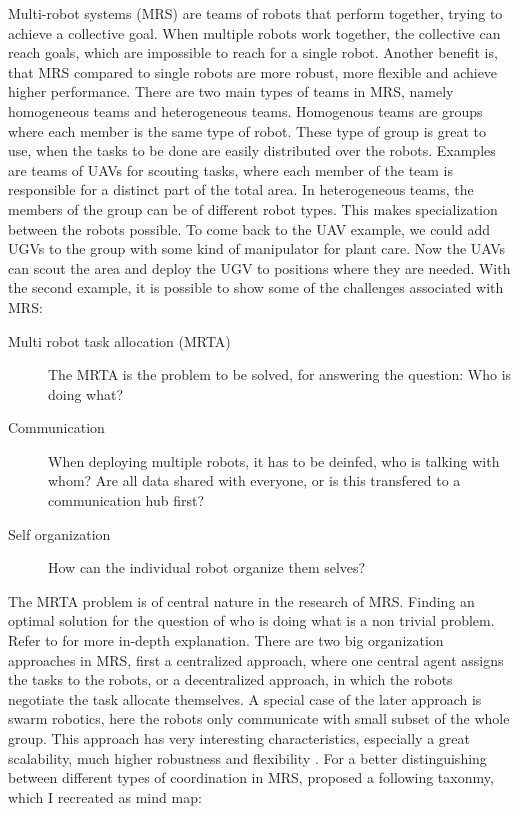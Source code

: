         Multi-robot systems (MRS) are teams of robots that perform together, trying to achieve a collective goal. When multiple robots work together, the collective can reach goals, which are impossible to reach for a single robot. Another benefit is, that MRS compared to single robots are more robust, more flexible and achieve higher performance. \cite{Albani2017}
        There are two main types of teams in MRS, namely homogeneous teams and heterogeneous teams. Homogenous teams are groups where each member is the same type of robot. These type of group is great to use, when the tasks to be done are easily distributed over the robots. Examples are teams of UAVs for scouting tasks, where each member of the team is responsible for a distinct part of the total area. 
        In heterogeneous teams, the members of the group can be of different robot types. This makes specialization between the robots possible. To come back to the UAV example, we could add UGVs to the group with some kind of manipulator for plant care. Now the UAVs can scout the area and deploy the UGV to positions where they are needed. 
        With the second example, it is possible to show some of the challenges associated with MRS: \ \begin{description}
            \item[Multi robot task allocation (MRTA)] The MRTA is the problem to be solved, for answering the question: Who is doing what?
            \item[Communication] When deploying multiple robots, it has to be deinfed, who is talking with whom? Are all data shared with everyone, or is this transfered to a communication hub first?
            \item[Self organization] How can the individual robot organize them selves?  
        \end{description}

        The MRTA problem is of central nature in the research of MRS. Finding an optimal solution for the question of who is doing what is a non trivial problem. Refer to \cite{Gerkey2004} for more in-depth explanation. There are two big organization approaches in MRS, first a centralized approach, where one central agent assigns the tasks to the robots, or a decentralized approach, in which the robots negotiate the task allocate themselves. A special case of the later approach is swarm robotics, here the robots only communicate with small subset of the whole group. This approach has very interesting characteristics, especially a great scalability, much higher robustness and flexibility \cite{Albani2017}.
        For a better distinguishing between different types of coordination in MRS, \cite{Farinelli2004} proposed a following taxonmy, which I recreated as mind map: 

